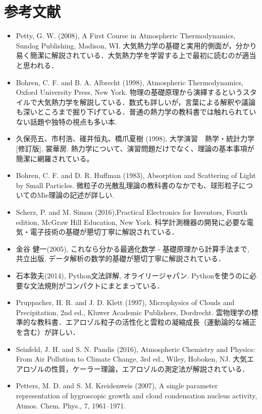 \documentclass{ltjsarticle}
\begin{document}
\section{参考文献}
\begin{itemize}
\item Petty, G. W. (2008), A First Course in Atmospheric Thermodynamics, Sundog Publishing, Madison, WI.
大気熱力学の基礎と実用的側面が，分かり易く簡潔に解説されている．大気熱力学を学習する上で最初に読むのが適当と思われる．
\item Bohren, C. F. and B. A. Albrecht (1998), Atmospheric Thermodynamics, Oxford University Press, New York.
物理の基礎原理から演繹するというスタイルで大気熱力学を解説している．数式も詳しいが，言葉による解釈や議論も深いところまで掘り下げている．普通の熱力学の教科書では触れられていない話題や独特の視点も多い本. 
\item 久保亮五、市村浩、碓井恒丸、橋爪夏樹 (1998), 大学演習　熱学・統計力学　[修訂版], 裳華房.
熱力学について、演習問題だけでなく、理論の基本事項が簡潔に網羅されている。
\item Bohren, C. F. and D. R. Huffman (1983), Absorption and Scattering of Light by Small Particles.
微粒子の光散乱理論の教科書のなかでも、球形粒子についてのMie理論の記述が詳しい. 
\item Scherz, P. and M. Simon (2016),Practical Electronics for Inventors, Fourth edition, McGraw Hill Education, New York.
科学計測機器の開発に必要な電気・電子技術の基礎が懇切丁寧に解説されている．
\item 金谷 健一(2005), これなら分かる最適化数学 - 基礎原理から計算手法まで, 共立出版.
データ解析の数学的基礎が懇切丁寧に解説されている．
\item 石本敦夫(2014), Python文法詳解, オライリージャパン.
Pythonを使うのに必要な文法規則がコンパクトにまとまっている．
\item Pruppacher, H. R. and J. D. Klett (1997), Microphysics of Clouds and Precipitation, 2nd ed., Kluwer Academic Publishers, Dordrecht.
雲物理学の標準的な教科書．エアロゾル粒子の活性化と雲粒の凝縮成長（運動論的な補正を含む）が詳しい．
\item Seinfeld, J. H. and S. N. Pandis (2016), Atmospheric Chemistry and Physics: From Air Pollution to Climate Change, 3rd ed., Wiley, Hoboken, NJ.
大気エアロゾルの性質，ケーラー理論，エアロゾルの測定法が解説されている．
\item Petters, M. D. and S. M. Kreidenweis (2007), A single parameter representation of hygroscopic growth and cloud condensation nucleus activity, Atmos. Chem. Phys., 7, 1961--1971.

\end{itemize}
\end{document}
